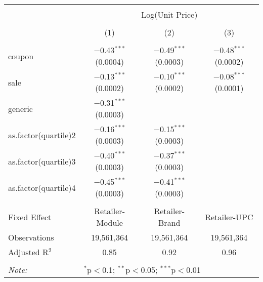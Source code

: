 
\begin{table}[!htbp] \centering 
  \caption{} 
  \label{tab:overallSavingsNonStorable} 
\begin{tabular}{@{\extracolsep{5pt}}lccc} 
\\[-1.8ex]\hline 
\hline \\[-1.8ex] 
 & \multicolumn{3}{c}{Log(Unit Price)} \\ 
\\[-1.8ex] & (1) & (2) & (3)\\ 
\hline \\[-1.8ex] 
 coupon & $-$0.43$^{***}$ (0.0004) & $-$0.49$^{***}$ (0.0003) & $-$0.48$^{***}$ (0.0002) \\ 
  sale & $-$0.13$^{***}$ (0.0002) & $-$0.10$^{***}$ (0.0002) & $-$0.08$^{***}$ (0.0001) \\ 
  generic & $-$0.31$^{***}$ (0.0003) &  &  \\ 
  as.factor(quartile)2 & $-$0.16$^{***}$ (0.0003) & $-$0.15$^{***}$ (0.0003) &  \\ 
  as.factor(quartile)3 & $-$0.40$^{***}$ (0.0003) & $-$0.37$^{***}$ (0.0003) &  \\ 
  as.factor(quartile)4 & $-$0.45$^{***}$ (0.0003) & $-$0.41$^{***}$ (0.0003) &  \\ 
 \hline \\[-1.8ex] 
Fixed Effect & Retailer-Module & Retailer-Brand & Retailer-UPC \\ 
Observations & 19,561,364 & 19,561,364 & 19,561,364 \\ 
Adjusted R$^{2}$ & 0.85 & 0.92 & 0.96 \\ 
\hline 
\hline \\[-1.8ex] 
\textit{Note:}  & \multicolumn{3}{l}{$^{*}$p$<$0.1; $^{**}$p$<$0.05; $^{***}$p$<$0.01} \\ 
\end{tabular} 
\end{table} 
